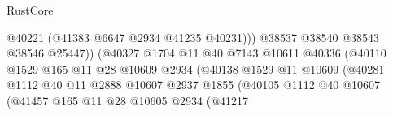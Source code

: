 \begin{lexlean}{RustCore}
\begin{coremodule}
                                                      @40221
                                                      (@41383 @6647 @2934 @41235 @40231)))
                                                  @38537
                                                  @38540
                                                  @38543
                                                  @38546
                                                  @25447))
                                              (@40327
                                                @1704
                                                @11
                                                @40
                                                @7143
                                                @10611
                                                @40336
                                                (@40110
                                                  @1529
                                                  @165
                                                  @11
                                                  @28
                                                  @10609
                                                  @2934
                                                  (@40138
                                                    @1529
                                                    @11
                                                    @10609
                                                    (@40281
                                                      @1112
                                                      @40
                                                      @11
                                                      @2888
                                                      @10607
                                                      @2937
                                                      @1855
                                                      (@40105
                                                        @1112
                                                        @40
                                                        @10607
                                                        (@41457
                                                          @165
                                                          @11
                                                          @28
                                                          @10605
                                                          @2934
                                                          (@41217

\end{coremodule}
\end{lexlean}

